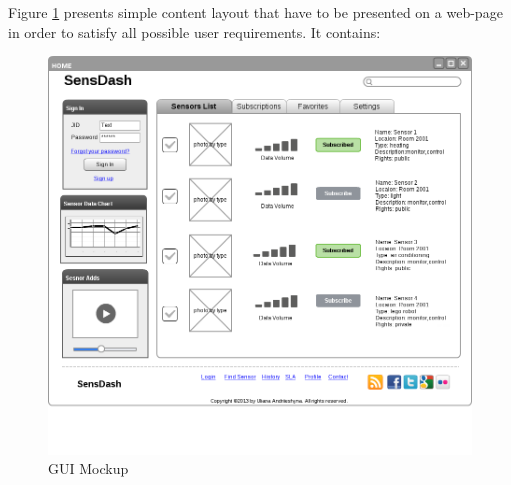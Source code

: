   Figure \ref{img:GUI Mockup} presents simple content layout that have to be presented on a web-page in order to satisfy all possible user requirements. It contains:

    \begin{figure}[!ht]
    \centering
    \includegraphics[scale=0.5]{images/Mockup.png}   
    \caption[GUI Mockup]{GUI Mockup}
    \label{img:GUI Mockup}                           
    \end{figure}

